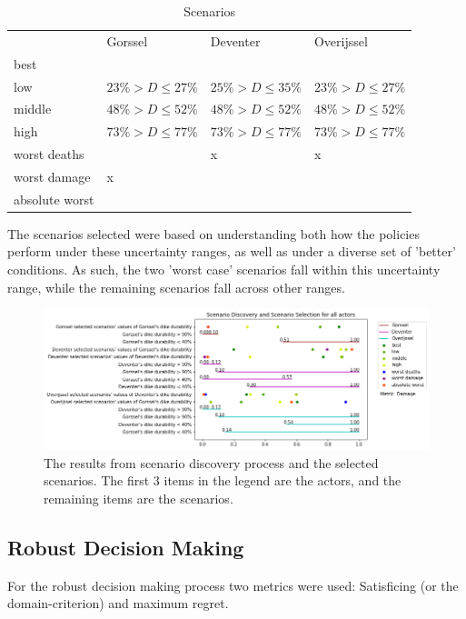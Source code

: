 \begin{table}[h!]
\caption{Scenarios}
\label{tab:scenarios}
\centering
\begin{tabular}{llll}
               & Gorssel& Deventer & Overijssel \\
best           & & & \\
low            & $23\%> D \leq 27\%$ & $25\%> D \leq 35\%$ & $23\%> D \leq 27\%$\\
middle         & $48\%> D \leq 52\%$ & $48\%> D \leq 52\%$ & $48\%> D \leq 52\%$ \\
high           & $73\%> D \leq 77\%$ & $73\%> D \leq 77\%$ & $73\%> D \leq 77\%$            \\
worst deaths   & & x & x \\
worst damage   & x &          & \\
absolute worst &  &          &           
\end{tabular}
\end{table}

The scenarios selected were based on understanding both how the policies perform under these uncertainty ranges, as well as under a diverse set of 'better' conditions. As such, the two 'worst case' scenarios fall within this uncertainty range, while the remaining scenarios fall across other ranges.


\begin{figure}[h]
    \centering
    \includegraphics[width=\textwidth]{report/figures/results/scenario_discovery.png}
    \caption{The results from scenario discovery process and the selected scenarios. The first 3 items in the legend are the actors, and the remaining items are the scenarios.}
    \label{fig:prim}
\end{figure}


\subsection{Robust Decision Making}
For the robust decision making process two metrics were used: Satisficing (or the domain-criterion) and maximum regret. 
